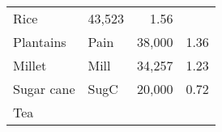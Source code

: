 \documentclass[]{article}
\begin{document}
\begin{longtable}[]{@{}llrr@{}}
\begin{minipage}[t]{0.16\columnwidth}
Rice\strut
\end{minipage} & \begin{minipage}[t]{0.12\columnwidth}\raggedleft\strut
43,523\strut
\end{minipage} & \begin{minipage}[t]{0.09\columnwidth}\raggedleft\strut
1.56\strut
\end{minipage}\tabularnewline
\begin{minipage}[t]{0.36\columnwidth}\raggedright\strut
Plantains\strut
\end{minipage} & \begin{minipage}[t]{0.16\columnwidth}\raggedright\strut
Pain\strut
\end{minipage} & \begin{minipage}[t]{0.12\columnwidth}\raggedleft\strut
38,000\strut
\end{minipage} & \begin{minipage}[t]{0.09\columnwidth}\raggedleft\strut
1.36\strut
\end{minipage}\tabularnewline
\begin{minipage}[t]{0.36\columnwidth}\raggedright\strut
Millet\strut
\end{minipage} & \begin{minipage}[t]{0.16\columnwidth}\raggedright\strut
Mill\strut
\end{minipage} & \begin{minipage}[t]{0.12\columnwidth}\raggedleft\strut
34,257\strut
\end{minipage} & \begin{minipage}[t]{0.09\columnwidth}\raggedleft\strut
1.23\strut
\end{minipage}\tabularnewline
\begin{minipage}[t]{0.36\columnwidth}\raggedright\strut
Sugar cane\strut
\end{minipage} & \begin{minipage}[t]{0.16\columnwidth}\raggedright\strut
SugC\strut
\end{minipage} & \begin{minipage}[t]{0.12\columnwidth}\raggedleft\strut
20,000\strut
\end{minipage} & \begin{minipage}[t]{0.09\columnwidth}\raggedleft\strut
0.72\strut
\end{minipage}\tabularnewline
\begin{minipage}[t]{0.36\columnwidth}\raggedright\strut
Tea\strut
\end{minipage} & \begin{minipage}[t]{0.16\columnwidth}\raggedright\strut

\end{minipage}
\end{longtable}
\end{document}

